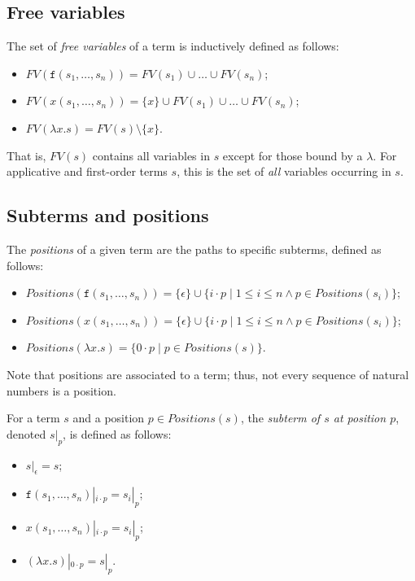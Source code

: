 \documentclass{lmcs}
\theoremstyle{theorem}\newtheorem{theorem}{Theorem}
\theoremstyle{theorem}\newtheorem{lemma}[theorem]{Lemma}
\theoremstyle{theorem}\newtheorem{corollary}[theorem]{Corollary}
\theoremstyle{definition}\newtheorem{definition}[theorem]{Definition}
\theoremstyle{definition}\newtheorem{example}[theorem]{Example}
\newcommand{\FV}{\mathit{FV}}
\newcommand{\Positions}{\mathit{Positions}}
\newcommand{\identifier}[1]{\mathtt{#1}}
\newcommand{\afun}{\identifier{f}}
\newcommand{\avar}{x}
\newcommand{\abs}[2]{\lambda #1.#2}
\begin{document}
\subsection{Free variables}
The set of \emph{free variables} of a term is inductively defined as follows:
\begin{itemize}
\item $\FV(\afun(s_1,\dots,s_n)) = \FV(s_1) \cup \dots \cup \FV(s_n)$;
\item $\FV(\avar(s_1,\dots,s_n)) = \{ \avar \} \cup \FV(s_1) \cup \dots \cup \FV(s_n)$;
\item $\FV(\abs{\avar}{s}) = \FV(s) \setminus \{ \avar \}$.
\end{itemize}
That is, $\FV(s)$ contains all variables in $s$ except for those bound by a $\lambda$.
For applicative and first-order terms $s$, this is the set of \emph{all} variables occurring in
$s$.

\subsection{Subterms and positions}

The \emph{positions} of a given term are the paths to specific subterms, defined as follows:

\begin{itemize}
\item $\Positions(\afun(s_1,\dots,s_n)) = \{ \epsilon \} \cup \{ i \cdot p \mid 1 \leq i
  \leq n \wedge p \in \mathit{Positions}(s_i) \}$;
\item $\Positions(\avar(s_1,\dots,s_n)) = \{ \epsilon \} \cup \{ i \cdot p \mid 1 \leq i
  \leq n \wedge p \in \Positions(s_i) \}$;
\item $\Positions(\abs{\avar}{s}) = \{ 0 \cdot p \mid p \in \Positions(s) \}$.
\end{itemize}
Note that positions are associated to a term; thus, not every sequence of natural numbers is a
position.

For a term $s$ and a position $p \in \Positions(s)$, the \emph{subterm of $s$ at position $p$},
denoted $s|_p$, is defined as follows:
\begin{itemize}
\item $s|_\epsilon = s$;
\item $\afun(s_1,\dots,s_n)|_{i \cdot p} = s_i|_p$;
\item $\avar(s_1,\dots,s_n)|_{i \cdot p} = s_i|_p$;
\item $(\abs{\avar}{s})|_{0 \cdot p} = s|_p$.
\end{itemize}
\end{document}
